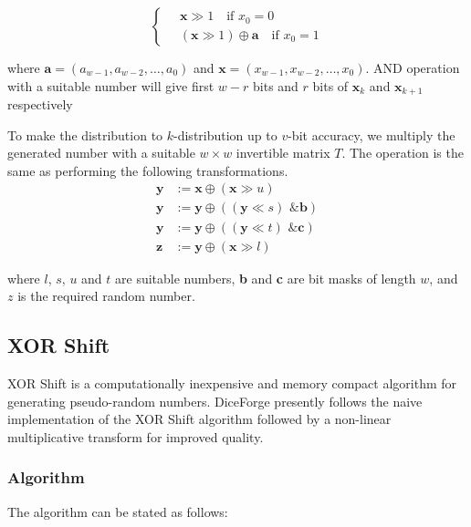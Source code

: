 \documentclass[titlepage, 11pt]{article}
\begin{document}
\begin{equation*}
\left\{
\begin{aligned}
     \quad \textbf{x} \gg 1 \quad \text{if } x_0 = 0 \\
     \quad (\textbf{x} \gg 1) \oplus \textbf{a} \quad \text{if } x_0 = 1
\end{aligned}
\right.
\end{equation*}

where $\textbf{a}=(a_{w-1},a_{w-2},\dots,a_{0})$ and $\textbf{x}=(x_{w-1},x_{w-2},\dots,x_{0})$. AND operation with a suitable number will give first $w-r$ bits and $r$ bits of $\textbf{x}_k$ and $\textbf{x}_{k+1}$ respectively

To make the distribution to $k$-distribution up to $v$-bit accuracy, we multiply the generated number with a suitable $w \times w$ invertible matrix $T$. The operation is the same as performing the following transformations.
\[
\begin{aligned}
  \textbf{y} &:= \textbf{x}\oplus(\textbf{x}\gg u) \\
  \textbf{y} &:= \textbf{y}\oplus((\textbf{y}\ll s)\text{ \& }\textbf{b}) \\
  \textbf{y} &:= \textbf{y}\oplus((\textbf{y}\ll t)\text{ \& }\textbf{c}) \\
  \textbf{z} &:= \textbf{y}\oplus(\textbf{x}\gg l)
\end{aligned}
\]

where $l$, $s$, $u$ and $t$ are suitable numbers, \textbf{b} and \textbf{c} are bit masks of length $w$,
and $z$ is the required random number.
\newline
\subsection{XOR Shift}
XOR Shift is a computationally inexpensive and memory compact algorithm for generating pseudo-random numbers. DiceForge presently follows the naive implementation of the XOR Shift algorithm followed by a non-linear multiplicative transform for improved quality.

\subsubsection{Algorithm}
The algorithm can be stated as follows:
\end{document}
